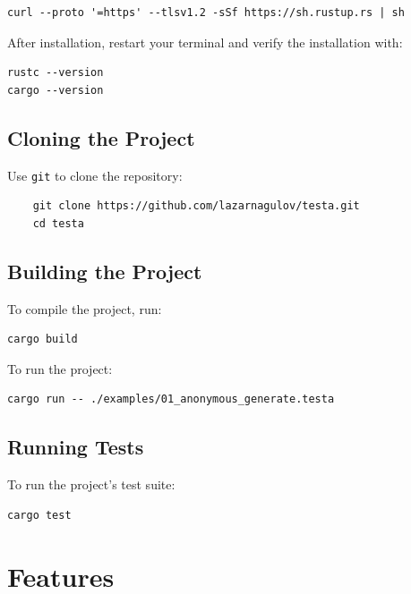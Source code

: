 \documentclass[11pt,a4paper]{article}
\begin{document}
    \begin{verbatim}
curl --proto '=https' --tlsv1.2 -sSf https://sh.rustup.rs | sh
    \end{verbatim}

    After installation, restart your terminal and verify the installation with:

    \begin{verbatim}
rustc --version
cargo --version
    \end{verbatim}

    \subsection{Cloning the Project}
    Use \texttt{git} to clone the repository:

    \begin{verbatim}
    git clone https://github.com/lazarnagulov/testa.git
    cd testa
    \end{verbatim}

    \subsection{Building the Project}
    To compile the project, run:
    \begin{verbatim}
cargo build 
    \end{verbatim}
    To run the project:
    \begin{verbatim}
cargo run -- ./examples/01_anonymous_generate.testa
    \end{verbatim}

    \subsection{Running Tests}

    To run the project's test suite:

    \begin{verbatim}
cargo test
    \end{verbatim}
    \newpage

    \section{Features}
\end{document}
